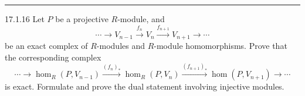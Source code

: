 \documentclass[a4paper, 12pt]{article}
\begin{document}
\noindent\rule{7in}{2.8pt}
\begin{problem}{17.1.16}
Let \(P\) be a projective \(R\)-module, and 
\[\cdots\rightarrow V_{n-1}\xrightarrow{f_n}V_n\xrightarrow{f_{n+1}}V_{n+1}\rightarrow \cdots \]
be an exact complex of \(R\)-modules and \(R\)-module homomorphisms. Prove that the corresponding complex 
\[\cdots\rightarrow\hom_R(P,V_{n-1})\xrightarrow{(f_n)_*}\hom_R(P,V_n)\xrightarrow{(f_{n+1})_*}\hom(P,V_{n+1})\rightarrow\cdots\]
is exact. Formulate and prove the dual statement involving injective modules.
\end{problem}
\end{document}
